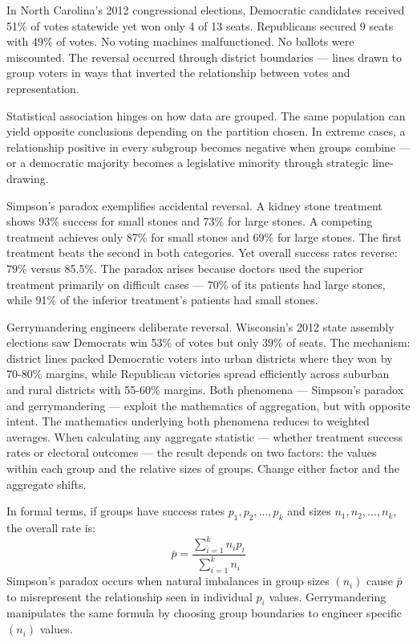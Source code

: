 In North Carolina's 2012 congressional elections, Democratic candidates received 51\% of votes statewide yet won only 4 of 13 seats. Republicans secured 9 seats with 49\% of votes. No voting machines malfunctioned. No ballots were miscounted. The reversal occurred through district boundaries — lines drawn to group voters in ways that inverted the relationship between votes and representation.

Statistical association hinges on how data are grouped. The same population can yield opposite conclusions depending on the partition chosen. In extreme cases, a relationship positive in every subgroup becomes negative when groups combine — or a democratic majority becomes a legislative minority through strategic line-drawing.

Simpson's paradox exemplifies accidental reversal. A kidney stone treatment shows 93\% success for small stones and 73\% for large stones. A competing treatment achieves only 87\% for small stones and 69\% for large stones. The first treatment beats the second in both categories. Yet overall success rates reverse: 79\% versus 85.5\%. The paradox arises because doctors used the superior treatment primarily on difficult cases — 70\% of its patients had large stones, while 91\% of the inferior treatment's patients had small stones.

Gerrymandering engineers deliberate reversal. Wisconsin's 2012 state assembly elections saw Democrats win 53\% of votes but only 39\% of seats. The mechanism: district lines packed Democratic voters into urban districts where they won by 70-80\% margins, while Republican victories spread efficiently across suburban and rural districts with 55-60\% margins. Both phenomena — Simpson's paradox and gerrymandering — exploit the mathematics of aggregation, but with opposite intent. The mathematics underlying both phenomena reduces to weighted averages. When calculating any aggregate statistic — whether treatment success rates or electoral outcomes — the result depends on two factors: the values within each group and the relative sizes of groups. Change either factor and the aggregate shifts.

In formal terms, if groups have success rates $p_1, p_2, ..., p_k$ and sizes $n_1, n_2, ..., n_k$, the overall rate is:
\[
\bar{p} = \frac{\sum_{i=1}^k n_i p_i}{\sum_{i=1}^k n_i}
\]
Simpson's paradox occurs when natural imbalances in group sizes $(n_i)$ cause $\bar{p}$ to misrepresent the relationship seen in individual $p_i$ values. Gerrymandering manipulates the same formula by choosing group boundaries to engineer specific $(n_i)$ values.

